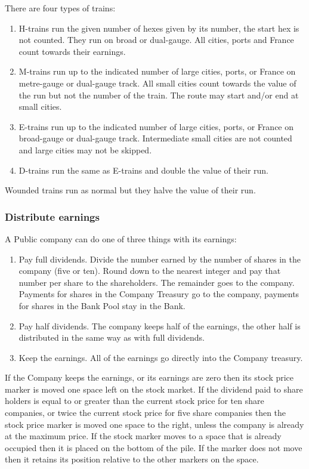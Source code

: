 \documentclass[a4paper,twocolumn]{article}
\begin{document}
There are four types of trains:
\begin{enumerate}
	\item H-trains run the given number of hexes given by its number, the start
	hex is not counted. They run on broad or dual-gauge. All cities, ports and
	France count towards their earnings.
	\item M-trains run up to the indicated number of large cities, ports, or
	France on metre-gauge or dual-gauge track. All small cities count towards
	the value of the run but not the number of the train. The route may start
	and/or end at small cities.
	\item E-trains run up to the indicated number of large cities, ports, or
	France on broad-gauge or dual-gauge track. Intermediate small cities are not
	counted and large cities may not be skipped.
	\item D-trains run the same as E-trains and double the value of their run.
\end{enumerate}
Wounded trains run as normal but they halve the value of their run.

\subsubsection{Distribute earnings}
A Public company can do one of three things with its earnings:
\begin{enumerate}
	\item Pay full dividends. Divide the number earned by the number of shares
	in the company (five or ten). Round down to the nearest integer and pay that
	number per share to the shareholders. The remainder goes to the company.
	Payments for shares in the Company Treasury go to the company, payments for
	shares in the Bank Pool stay in the Bank.
	\item Pay half dividends. The company keeps half of the earnings, the other
	half is distributed in the same way as with full dividends.
	\item Keep the earnings. All of the earnings go directly into the Company
	treasury.
\end{enumerate}

If the Company keeps the earnings, or its earnings are zero then its stock price
marker is moved one space left on the stock market. If the dividend paid to
share holders is equal to or greater than the current stock price for ten share
companies, or twice the current stock price for five share companies then the
stock price marker is moved one space to the right, unless the company is
already at the maximum price. If the stock marker moves to a space that is
already occupied then it is placed on the bottom of the pile. If the marker does
not move then it retains its position relative to the other markers on the
space.
\end{document}
